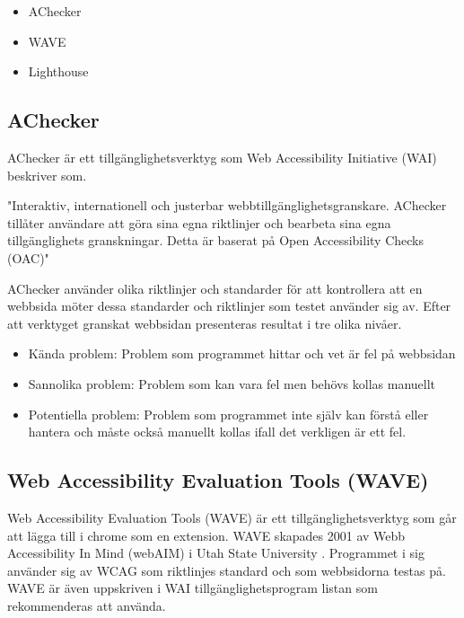 \documentclass[11p]{article}
\begin{document}
    \begin{itemize}
        \item AChecker
        \item WAVE
        \item Lighthouse
    \end{itemize}

    \subsection{AChecker}
    AChecker är ett tillgänglighetsverktyg som Web Accessibility Initiative (WAI) beskriver som.

    "Interaktiv, internationell och justerbar webbtillgänglighetsgranskare.
    AChecker tillåter användare att göra sina egna riktlinjer och bearbeta sina egna tillgänglighets granskningar.
    Detta är baserat på Open Accessibility Checks (OAC)" \textcite{AChecker}

    AChecker använder olika riktlinjer och standarder för att kontrollera att en webbsida möter dessa standarder och riktlinjer som testet använder sig av.
    Efter att verktyget granskat webbsidan presenteras resultat i tre olika nivåer.

    \begin{itemize}
        \item Kända problem: Problem som programmet hittar och vet är fel på webbsidan
        \item Sannolika problem: Problem som kan vara fel men behövs kollas manuellt
        \item Potentiella problem: Problem som programmet inte själv kan förstå eller hantera och måste också manuellt kollas ifall det verkligen är ett fel.
    \end{itemize}
    
    \subsection{Web Accessibility Evaluation Tools (WAVE)}
    Web Accessibility Evaluation Tools (WAVE) är ett tillgänglighetsverktyg som går att lägga till i chrome som en extension.
    WAVE skapades 2001 av Webb Accessibility In Mind (webAIM) i Utah State University \textcite{WAVE}.
    Programmet i sig använder sig av WCAG som riktlinjes standard och som webbsidorna testas på.
    WAVE är även uppskriven i WAI tillgänglighetsprogram listan som rekommenderas att använda.
\end{document}
